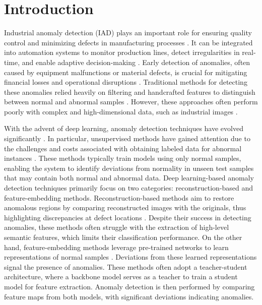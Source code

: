 \section*{Introduction}

Industrial anomaly detection (IAD) plays an important role for ensuring quality control and minimizing defects in manufacturing processes \cite{chandola2009anomaly, iturbe2017towards, prunella2023deep}. It can be integrated into automation systems \cite{hoang2024graspability, cui2023survey, vu2024occlusion} to monitor production lines, detect irregularities in real-time, and enable adaptive decision-making \cite{bergmann2020uninformed, hoang2019object, liu2020towards, hoang2022context}. Early detection of anomalies, often caused by equipment malfunctions or material defects, is crucial for mitigating financial losses and operational disruptions \cite{ren2024steel, zhang2024defect}. Traditional methods for detecting these anomalies relied heavily on filtering and handcrafted features to distinguish between normal and abnormal samples \cite{chandola2009anomaly}. However, these approaches often perform poorly with complex and high-dimensional data, such as industrial images \cite{yang2019real}.

With the advent of deep learning, anomaly detection techniques have evolved significantly \cite{tao2022deep, cui2023survey}. In particular, unsupervised methods have gained attention due to the challenges and costs associated with obtaining labeled data for abnormal instances \cite{cui2023survey}. These methods typically train models using only normal samples, enabling the system to identify deviations from normality in unseen test samples that may contain both normal and abnormal data. Deep learning-based anomaly detection techniques primarily focus on two categories: reconstruction-based and feature-embedding methods. Reconstruction-based methods aim to restore anomalous regions by comparing reconstructed images with the originals, thus highlighting discrepancies at defect locations \cite{akcay2019ganomaly, yu2023unsupervised, liu2020towards}. Despite their success in detecting anomalies, these methods often struggle with the extraction of high-level semantic features, which limits their classification performance. On the other hand, feature-embedding methods leverage pre-trained networks to learn representations of normal samples \cite{bergmann2020uninformed, salehi2021multiresolution, wang2021student, cao2022informative}. Deviations from these learned representations signal the presence of anomalies. These methods often adopt a teacher-student architecture, where a backbone model serves as a teacher to train a student model for feature extraction. Anomaly detection is then performed by comparing feature maps from both models, with significant deviations indicating anomalies.

